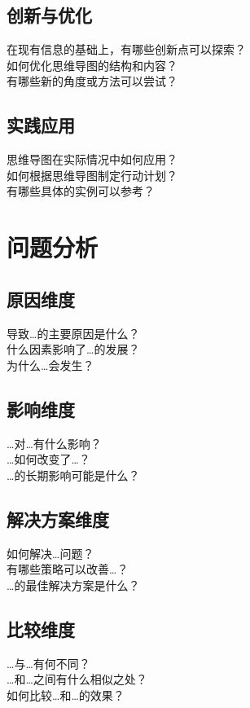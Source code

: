 \documentclass[12pt]{book}
\begin{document}
\subsection{创新与优化}
在现有信息的基础上，有哪些创新点可以探索？\\
如何优化思维导图的结构和内容？\\
有哪些新的角度或方法可以尝试？\\

\subsection{实践应用}
思维导图在实际情况中如何应用？\\
如何根据思维导图制定行动计划？\\
有哪些具体的实例可以参考？\\


\section{问题分析}
\subsection{原因维度}
导致…的主要原因是什么？\\
什么因素影响了…的发展？\\
为什么…会发生？\\

\subsection{影响维度}
…对…有什么影响？\\
…如何改变了…？\\
…的长期影响可能是什么？\\

\subsection{解决方案维度}
如何解决…问题？\\
有哪些策略可以改善…？\\
…的最佳解决方案是什么？\\

\subsection{比较维度}
…与…有何不同？\\
…和…之间有什么相似之处？\\
如何比较…和…的效果？\\
\end{document}
